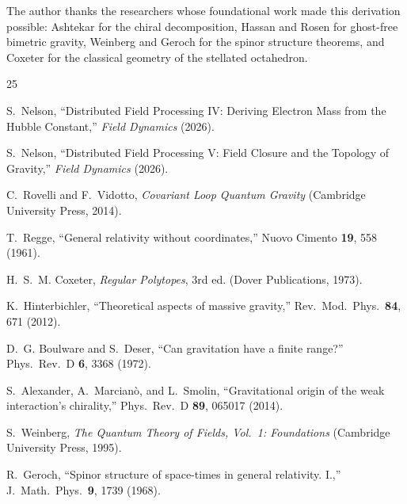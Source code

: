 \documentclass[aps,prd,preprint,superscriptaddress,showpacs,preprintnumbers,amsmath,amssymb,nofootinbib]{revtex4-2}
\begin{document}
\begin{acknowledgments}
The author thanks the researchers whose foundational work made this derivation possible: Ashtekar for the chiral decomposition, Hassan and Rosen for ghost-free bimetric gravity, Weinberg and Geroch for the spinor structure theorems, and Coxeter for the classical geometry of the stellated octahedron.
\end{acknowledgments}

\begin{thebibliography}{25}

S.~Nelson, ``Distributed Field Processing IV: Deriving Electron Mass from the Hubble Constant,'' \emph{Field Dynamics} (2026).

S.~Nelson, ``Distributed Field Processing V: Field Closure and the Topology of Gravity,'' \emph{Field Dynamics} (2026).

C.~Rovelli and F.~Vidotto, \emph{Covariant Loop Quantum Gravity} (Cambridge University Press, 2014).

T.~Regge, ``General relativity without coordinates,'' Nuovo Cimento \textbf{19}, 558 (1961).

H.~S.~M. Coxeter, \emph{Regular Polytopes}, 3rd ed. (Dover Publications, 1973).

K.~Hinterbichler, ``Theoretical aspects of massive gravity,'' Rev.\ Mod.\ Phys.\ \textbf{84}, 671 (2012).

D.~G. Boulware and S.~Deser, ``Can gravitation have a finite range?'' Phys.\ Rev.\ D \textbf{6}, 3368 (1972).

S.~Alexander, A.~Marcian\`o, and L.~Smolin, ``Gravitational origin of the weak interaction's chirality,'' Phys.\ Rev.\ D \textbf{89}, 065017 (2014).

S.~Weinberg, \emph{The Quantum Theory of Fields, Vol.\ 1: Foundations} (Cambridge University Press, 1995).

R.~Geroch, ``Spinor structure of space-times in general relativity. I.,'' J.\ Math.\ Phys.\ \textbf{9}, 1739 (1968).


\end{thebibliography}
\end{document}
